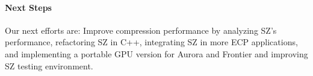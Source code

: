\paragraph{Next Steps} Our next efforts are: Improve compression performance by analyzing SZ's performance, refactoring SZ in C++, integrating SZ in more ECP applications, and implementing a portable GPU version for Aurora and Frontier and improving SZ testing environment.

